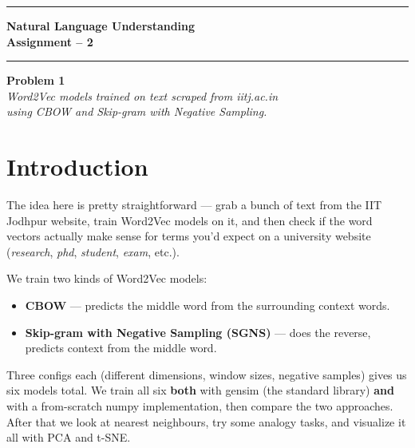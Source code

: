 \documentclass[11pt,a4paper]{article}
\begin{document}
\begin{titlepage}
  \centering
  \vspace*{2cm}
  {\color{iitjblue}\rule{\linewidth}{2pt}}\vspace{0.4cm}

  {\Huge\bfseries\color{iitjblue} Natural Language Understanding\\[0.3em]
   \Large Assignment -- 2}\\[0.6em]

  {\color{iitjblue}\rule{\linewidth}{2pt}}

  \vspace{1.5cm}
  {\Large\bfseries Problem 1}\\[2em]

  \vfill
  \textit{\color{darkgray}
    Word2Vec models trained on text scraped from iitj.ac.in\\
    using CBOW and Skip-gram with Negative Sampling.}
  \vspace{1cm}
\end{titlepage}

\tableofcontents
\newpage

\section{Introduction}

The idea here is pretty straightforward --- grab a bunch of text from the IIT Jodhpur website, train Word2Vec models on it, and then check if the word vectors actually make sense for terms you'd expect on a university website (\textit{research}, \textit{phd}, \textit{student}, \textit{exam}, etc.).

We train two kinds of Word2Vec models:
\begin{itemize}[nosep]
  \item \textbf{CBOW} --- predicts the middle word from the surrounding context words.
  \item \textbf{Skip-gram with Negative Sampling (SGNS)} --- does the reverse, predicts context from the middle word.
\end{itemize}

Three configs each (different dimensions, window sizes, negative samples) gives us six models total. We train all six \textbf{both} with gensim (the standard library) \textbf{and} with a from-scratch numpy implementation, then compare the two approaches. After that we look at nearest neighbours, try some analogy tasks, and visualize it all with PCA and t-SNE.
\end{document}
